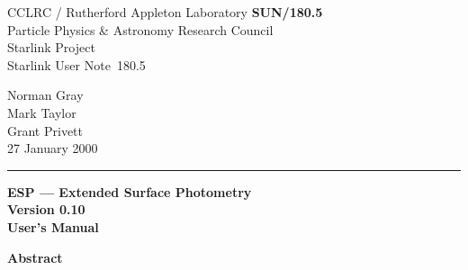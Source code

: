\documentclass[twoside,11pt]{article}
\newcommand{\stardoccategory}  {Starlink User Note}
\newcommand{\stardocinitials}  {SUN}
\newcommand{\stardocnumber}    {180.5}
\newcommand{\stardocauthors}   {Norman Gray\\Mark Taylor\\Grant Privett}
\newcommand{\stardocdate}      {27 January 2000}
\newcommand{\stardoctitle}     {ESP --- Extended Surface Photometry}
\newcommand{\stardocversion}   {Version 0.10}
\newcommand{\stardocmanual}    {User's Manual}
\newcommand{\stardocname}{\stardocinitials /\stardocnumber}
\newenvironment{latexonly}{}{}
\begin{document}
\thispagestyle{empty}

\begin{latexonly}
   CCLRC / {\sc Rutherford Appleton Laboratory} \hfill {\bf \stardocname}\\
   {\large Particle Physics \& Astronomy Research Council}\\
   {\large Starlink Project\\}
   {\large \stardoccategory\ \stardocnumber}
   \begin{flushright}
   \stardocauthors\\
   \stardocdate
   \end{flushright}
   \vspace{-4mm}
   \rule{\textwidth}{0.5mm}
   \vspace{5mm}
   \begin{center}
   {\Huge\bf  \stardoctitle \\ [2.5ex]}
   {\LARGE\bf \stardocversion \\ [4ex]}
   {\Huge\bf  \stardocmanual}
   \end{center}
   \vspace{5mm}

   \vspace{10mm}
   \begin{center}
      {\Large\bf Abstract}
   \end{center}
\end{latexonly}
\end{document}
